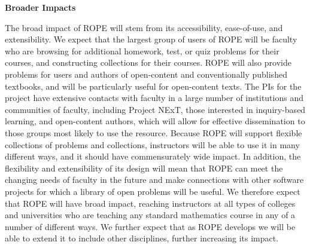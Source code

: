 \documentclass[11pt]{article}
\begin{document}
\bigskip\bigskip
\noindent
{\large \textbf{Broader Impacts}}

The broad impact of ROPE will stem from its accessibility, ease-of-use, and
extensibility.  We expect that the largest group of users of ROPE will be
faculty who are browsing for additional homework, test, or quiz problems
for their courses, and constructing collections for their courses.  ROPE
will also provide problems for users and authors of open-content and
conventionally published textbooks, and will be particularly useful for
open-content texts.  The PIs for the project have extensive contacts with
faculty in a large number of institutions and communities of faculty,
including Project NExT, those interested in inquiry-based learning, and
open-content authors, which will allow for effective dissemination to those 
groups most likely to use the resource.  Because ROPE will support flexible 
collections of problems and collections, instructors will be able to use it in 
many different ways, and it should have commensurately wide impact.  
In addition, the flexibility and
extensibility of its design will mean that ROPE can meet the changing
needs of faculty in the future and make connections with other software
projects for which a library of open problems will be useful.  We
therefore expect that ROPE will have broad impact, reaching instructors at
all types of colleges and universities who are teaching any standard
mathematics course in any of a number of different ways.  We further
expect that as ROPE develops we will be able to extend it to include other
disciplines, further increasing its impact.
\end{document}
